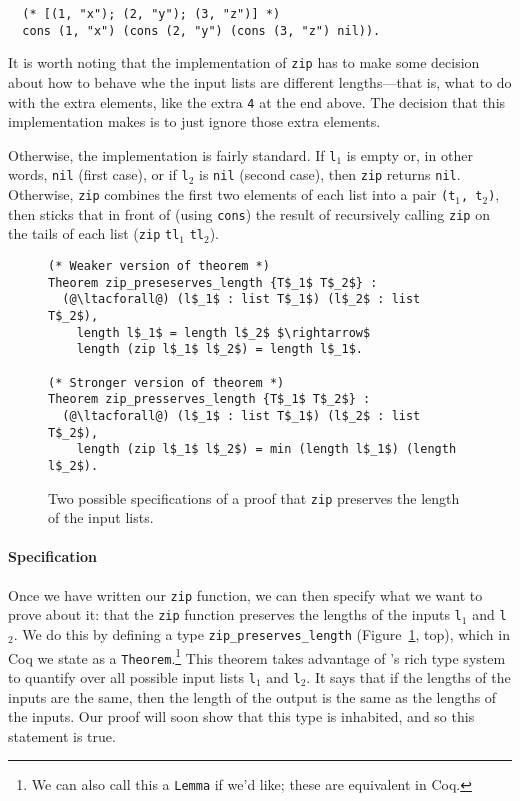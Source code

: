 \begin{lstlisting}
  (* [(1, "x"); (2, "y"); (3, "z")] *)
  cons (1, "x") (cons (2, "y") (cons (3, "z") nil)).
\end{lstlisting}

It is worth noting that the implementation of \lstinline{zip} has to make some decision about
how to behave whe the input lists are different lengths---that is, what to do with the extra elements,
like the extra \lstinline{4} at the end above.
The decision that this implementation makes is to just ignore those extra elements.

Otherwise, the implementation is fairly standard.
If \lstinline{l}$_1$ is empty or, in other words, \lstinline{nil} (first case),
or if \lstinline{l}$_2$ is \lstinline{nil} (second case), 
then \lstinline{zip} returns \lstinline{nil}.
Otherwise,
\lstinline{zip} combines the first two elements of each list into a pair \lstinline{(t}$_1$\lstinline{, t}$_2$\lstinline{)},
then sticks that in front of (using \lstinline{cons}) the result of recursively calling \lstinline{zip} on the tails of each list
(\lstinline{zip} \lstinline{tl}$_1$ \lstinline{tl}$_2$). %

\begin{figure}
\begin{lstlisting}
(* Weaker version of theorem *)
Theorem zip_preseserves_length {T$_1$ T$_2$} :
  (@\ltacforall@) (l$_1$ : list T$_1$) (l$_2$ : list T$_2$),
    length l$_1$ = length l$_2$ $\rightarrow$
    length (zip l$_1$ l$_2$) = length l$_1$.

(* Stronger version of theorem *)
Theorem zip_presserves_length {T$_1$ T$_2$} :
  (@\ltacforall@) (l$_1$ : list T$_1$) (l$_2$ : list T$_2$),
    length (zip l$_1$ l$_2$) = min (length l$_1$) (length l$_2$).
\end{lstlisting}
\caption{Two possible specifications of a proof that \lstinline{zip} preserves the length of the input lists.}
\label{fig:zip-pres}
\end{figure}

\paragraph{Specification} Once we have written our \lstinline{zip} function, we can then specify what we 
want to prove about it: that the \lstinline{zip} function preserves the lengths of the inputs \lstinline{l}$_1$ and \lstinline{l}$_2$.
We do this by defining a type \lstinline{zip_preserves_length} (Figure~\ref{fig:zip-pres}, top), which in Coq 
we state as a \lstinline{Theorem}.\footnote{We can also call this a \lstinline{Lemma} if we'd like; these are equivalent in Coq.}
This theorem takes advantage of 's rich type system to quantify over all possible input lists \lstinline{l}$_1$ and \lstinline{l}$_2$.
It says that if the lengths of the inputs are the same, then the length of the output is the same as the lengths of the inputs.
Our proof will soon show that this type is inhabited, and so this statement is true.

